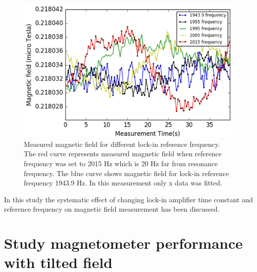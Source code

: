 \begin{figure}[h]
\centering\includegraphics[width=0.8\linewidth]{figures/reference_frequency}
\caption{Measured magnetic field for different lock-in reference frequency. The red curve represents measured magnetic field when reference frequency was set to 2015 Hz which is 20 Hz far from resonance frequency. The blue curve shows magnetic field for lock-in reference frequency 1943.9 Hz. In this measurement only x data was fitted. \label{fig:field for different lockin ref freq}}
\end{figure}
   


 In this study the systematic effect of changing lock-in amplifier time constant and reference frequency  on magnetic field measurement has been discussed.
 
  
  
  


\section{Study magnetometer performance with tilted field} 
\label{sec:tilted-results}


